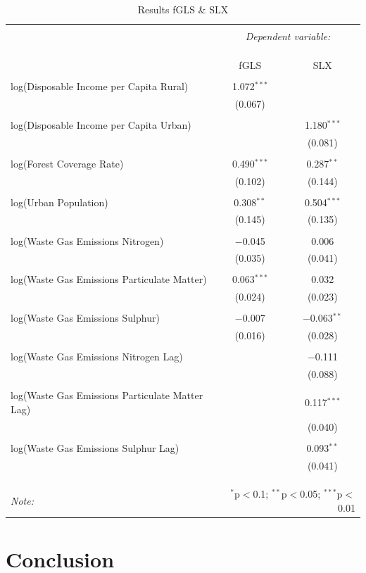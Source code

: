 \documentclass[]{article}
\begin{document}
\begin{table}[!htbp] \centering 
	\caption{Results fGLS \& SLX} 
	\label{} 
	\begin{tabular}{@{\extracolsep{5pt}}lcc} 
		\\[-1.8ex]\hline 
		\hline \\[-1.8ex] 
		& \multicolumn{2}{c}{\textit{Dependent variable:}} \\ 
		\cline{2-3} 
		\\[-1.8ex] & \multicolumn{2}{c}{ } \\ 
		\\[-1.8ex] & fGLS & SLX\\ 
		\hline \\[-1.8ex] 
		log(Disposable Income per Capita Rural) & 1.072$^{***}$ &  \\ 
		& (0.067) &  \\ 
		& & \\ 
		log(Disposable Income per Capita Urban) &  & 1.180$^{***}$ \\ 
		&  & (0.081) \\ 
		& & \\ 
		log(Forest Coverage Rate) & 0.490$^{***}$ & 0.287$^{**}$ \\ 
		& (0.102) & (0.144) \\ 
		& & \\ 
		log(Urban Population) & 0.308$^{**}$ & 0.504$^{***}$ \\ 
		& (0.145) & (0.135) \\ 
		& & \\ 
		log(Waste Gas Emissions Nitrogen) & $-$0.045 & 0.006 \\ 
		& (0.035) & (0.041) \\ 
		& & \\ 
		log(Waste Gas Emissions Particulate Matter) & 0.063$^{***}$ & 0.032 \\ 
		& (0.024) & (0.023) \\ 
		& & \\ 
		log(Waste Gas Emissions Sulphur) & $-$0.007 & $-$0.063$^{**}$ \\ 
		& (0.016) & (0.028) \\ 
		& & \\ 
		log(Waste Gas Emissions Nitrogen Lag) &  & $-$0.111 \\ 
		&  & (0.088) \\ 
		& & \\ 
		log(Waste Gas Emissions Particulate Matter Lag) &  & 0.117$^{***}$ \\ 
		&  & (0.040) \\ 
		& & \\ 
		log(Waste Gas Emissions Sulphur Lag) &  & 0.093$^{**}$ \\ 
		&  & (0.041) \\ 
		& & \\ 
		\hline \\[-1.8ex] 
		\hline 
		\hline \\[-1.8ex] 
		\textit{Note:}  & \multicolumn{2}{r}{$^{*}$p$<$0.1; $^{**}$p$<$0.05; $^{***}$p$<$0.01} \\ 
	\end{tabular} 
\end{table} 

\section{Conclusion}
\end{document}
